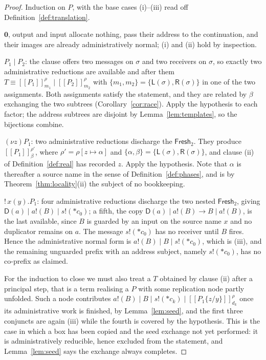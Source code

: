 \documentclass[11pt]{article}
\theoremstyle{definition}
\theoremstyle{plain}
\theoremstyle{remark}
\newcommand{\drp}[1]{{*}#1}
\newcommand{\out}[2]{#1!(#2)}
\newcommand{\enc}[1]{[\![#1]\!]}
\newcommand{\nil}{\mathbf{0}}
\newcommand{\Lft}{\mathsf{L}}
\newcommand{\Rgt}{\mathsf{R}}
\newcommand{\Frsh}{\mathsf{Fresh}_2}
\newcommand{\Dup}{\mathsf{D}}
\begin{document}
\begin{proof}
Induction on $P$, with the base cases (i)--(iii) read off
Definition~\ref{def:translation}.

$\nil$, output and input allocate nothing, pass their address to the
continuation, and their images are already administratively normal;
(i) and (ii) hold by inspection.

$P_1 \mid P_2$: the clause offers two messages on $\sigma$ and two
receivers on $\sigma$, so exactly two administrative reductions are
available and after them $T \equiv \enc{P_1}^\rho_{m_1} \mid
\enc{P_2}^\rho_{m_2}$ with $\{m_1,m_2\} = \{\Lft(\sigma),\Rgt(\sigma)\}$
in one of the two assignments. Both assignments satisfy the statement,
and they are related by $\beta$ exchanging the two subtrees
(Corollary~\ref{cor:race}). Apply the hypothesis to each factor; the
address subtrees are disjoint by Lemma~\ref{lem:templates}, so the
bijections combine.

$(\nu z)P_1$: two administrative reductions discharge the $\Frsh$. They
produce $\enc{P_1}^{\rho'}_{\beta}$, where
$\rho' = \rho[z\mapsto\alpha]$ and
$\{\alpha,\beta\} = \{\Lft(\sigma),\Rgt(\sigma)\}$, and clause (ii) of
Definition~\ref{def:real} has recorded $z$. Apply the hypothesis. Note
that $\alpha$ is thereafter a source name in the sense of
Definition~\ref{def:phases}, and is by
Theorem~\ref{thm:locality}(ii) the subject of no bookkeeping.

$!\,x(y).P_1$: four administrative reductions discharge the two nested
$\Frsh$, giving $\Dup(a) \mid \out{a}{B} \mid \out{s}{\drp{c_0}}$; a
fifth, the copy $\Dup(a) \mid \out{a}{B} \to B \mid \out{a}{B}$, is the
last available, since $B$ is guarded by an input on the source name $x$
and no duplicator remains on $a$. The message $\out{s}{\drp{c_0}}$ has no
receiver until $B$ fires. Hence the administrative normal form is
$\out{a}{B} \mid B \mid \out{s}{\drp{c_0}}$, which is (iii), and the
remaining unguarded prefix with an address subject, namely
$\out{s}{\drp{c_0}}$, has no co-prefix as claimed.

For the induction to close we must also treat a $T$ obtained by clause
(ii) after a principal step, that is a term realising a $P$ with some
replication node partly unfolded. Such a node contributes
$\out{a}{B} \mid B \mid \out{s}{\drp{c_k}} \mid \enc{P_1\{z/y\}}^\rho_{d_k}$
once its administrative work is finished, by Lemma~\ref{lem:seed}, and the
first three conjuncts are again (iii) while the fourth is covered by the
hypothesis. This is the case in which a box has been copied and the seed
exchange not yet performed: it is administratively reducible, hence
excluded from the statement, and Lemma~\ref{lem:seed} says the exchange
always completes.
\end{proof}
\end{document}
